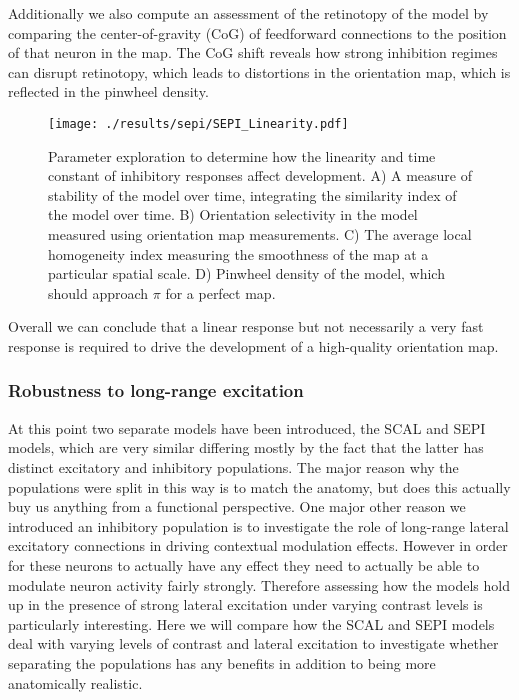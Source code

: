 Additionally we also compute an assessment of the retinotopy of the
model by comparing the center-of-gravity (CoG) of feedforward
connections to the position of that neuron in the map. The CoG shift
reveals how strong inhibition regimes can disrupt retinotopy, which
leads to distortions in the orientation map, which is reflected in the
pinwheel density.

\begin{figure}
	\centering
        \texttt{[image: ./results/sepi/SEPI\_Linearity.pdf]}
	\caption{Parameter exploration to determine how the linearity and
      time constant of inhibitory responses affect development. A) A
      measure of stability of the model over time, integrating the
      similarity index of the model over time. B) Orientation
      selectivity in the model measured using orientation map
      measurements. C) The average local homogeneity index measuring
      the smoothness of the map at a particular spatial scale. D)
      Pinwheel density of the model, which should approach $\pi$ for a
      perfect map.}
	\label{SEPILinearity}
\end{figure}

Overall we can conclude that a linear response but not necessarily a
very fast response is required to drive the development of a
high-quality orientation map.

\subsubsection{Robustness to long-range excitation}

At this point two separate models have been introduced, the SCAL and
SEPI models, which are very similar differing mostly by the fact that
the latter has distinct excitatory and inhibitory populations. The
major reason why the populations were split in this way is to match
the anatomy, but does this actually buy us anything from a functional
perspective. One major other reason we introduced an inhibitory
population is to investigate the role of long-range lateral excitatory
connections in driving contextual modulation effects. However in order
for these neurons to actually have any effect they need to actually be
able to modulate neuron activity fairly strongly. Therefore assessing
how the models hold up in the presence of strong lateral excitation
under varying contrast levels is particularly interesting. Here we
will compare how the SCAL and SEPI models deal with varying levels of
contrast and lateral excitation to investigate whether separating the
populations has any benefits in addition to being more anatomically
realistic.

